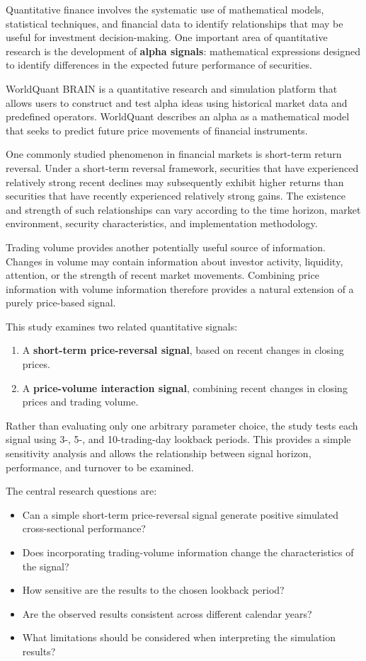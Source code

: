 \documentclass{article}
\begin{document}
Quantitative finance involves the systematic use of mathematical models, statistical techniques, and financial data to identify relationships that may be useful for investment decision-making. One important area of quantitative research is the development of \textbf{alpha signals}: mathematical expressions designed to identify differences in the expected future performance of securities.

WorldQuant BRAIN is a quantitative research and simulation platform that allows users to construct and test alpha ideas using historical market data and predefined operators. WorldQuant describes an alpha as a mathematical model that seeks to predict future price movements of financial instruments. 

One commonly studied phenomenon in financial markets is short-term return reversal. Under a short-term reversal framework, securities that have experienced relatively strong recent declines may subsequently exhibit higher returns than securities that have recently experienced relatively strong gains. The existence and strength of such relationships can vary according to the time horizon, market environment, security characteristics, and implementation methodology.

Trading volume provides another potentially useful source of information. Changes in volume may contain information about investor activity, liquidity, attention, or the strength of recent market movements. Combining price information with volume information therefore provides a natural extension of a purely price-based signal.

This study examines two related quantitative signals:

\begin{enumerate}
    \item A \textbf{short-term price-reversal signal}, based on recent changes in closing prices. 
    \item A \textbf{price-volume interaction signal}, combining recent changes in closing prices and trading volume. 
\end{enumerate}
Rather than evaluating only one arbitrary parameter choice, the study tests each signal using 3-, 5-, and 10-trading-day lookback periods. This provides a simple sensitivity analysis and allows the relationship between signal horizon, performance, and turnover to be examined.

The central research questions are:

\begin{itemize}
    \item Can a simple short-term price-reversal signal generate positive simulated cross-sectional performance? 
    \item Does incorporating trading-volume information change the characteristics of the signal? 
    \item How sensitive are the results to the chosen lookback period? 
    \item Are the observed results consistent across different calendar years? 
    \item What limitations should be considered when interpreting the simulation results? 
\end{itemize}
\end{document}
